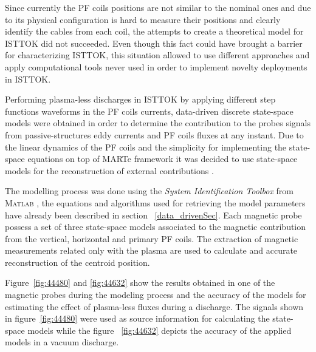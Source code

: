  Since currently the PF coils positions are not similar to the nominal ones and due to its physical configuration is hard to measure their positions and clearly identify the cables from each coil, the attempts to create a theoretical model for ISTTOK did not succeeded. Even though this fact could have brought a barrier for characterizing ISTTOK, this situation allowed to use different approaches and apply computational tools never used  in order to implement novelty deployments in ISTTOK.   \smallskip

Performing plasma-less discharges in ISTTOK by applying different step functions waveforms in the PF coils currents,  data-driven discrete state-space models were obtained in order to determine the contribution to the probes signals from passive-structures eddy currents and PF coils fluxes at any instant. Due to the linear dynamics of the PF coils and the simplicity for implementing the state-space equations on top of MARTe framework it was decided to use state-space models for the reconstruction of external contributions \cite[Chapter~2]{Chen1999}.\smallskip

 The modelling process was done using the \textit{System Identification Toolbox} from \textsc{Matlab} \cite[Chapters~2,3]{Toolbox}, the equations and algorithms used for retrieving the model parameters have already been described  in section ~\ref{data_drivenSec}. Each magnetic probe possess a set of three state-space models associated to the magnetic contribution from the vertical, horizontal and primary PF coils. The extraction of magnetic measurements related only with the plasma  are used to calculate and accurate reconstruction of the centroid position. \smallskip


Figure~\ref{fig:44480} and \ref{fig:44632} show the results obtained in one of the magnetic probes during the modeling process and the accuracy of the models for estimating the effect of plasma-less fluxes during a discharge. The signals shown in figure~\ref{fig:44480} were used as source information for calculating the state-space models while the figure ~\ref{fig:44632} depicts the accuracy of the applied models in a vacuum discharge.

